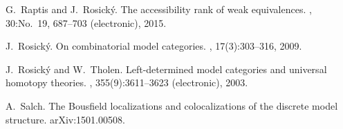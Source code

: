 \documentclass[a4paper,12pt]{amsart}
\begin{document}
\begin{thebibliography}{10}
G.~Raptis and J.~Rosick\'y.
\newblock The accessibility rank of weak equivalences.
, 30:No.\ 19, 687--703 (electronic), 2015.

J.~Rosick{\'y}.
\newblock On combinatorial model categories.
, 17(3):303--316, 2009.

J.~Rosick{\'y} and W.~Tholen.
\newblock Left-determined model categories and universal homotopy theories.
, 355(9):3611--3623 (electronic), 2003.

A.~Salch.
\newblock The {B}ousfield localizations and colocalizations of the discrete
  model structure.
\newblock arXiv:1501.00508.

\end{thebibliography}
\end{document}
